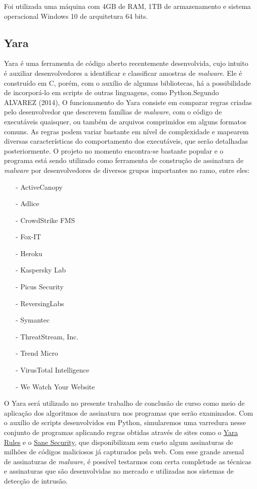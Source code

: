 Foi utilizada uma máquina com 4GB de RAM, 1TB de armazenamento e sistema operacional Windows 10 de arquitetura 64 bits.

\subsection{Yara}
\label{sub:Yara}

Yara é uma ferramenta de código aberto recentemente desenvolvida, cujo intuito é
auxiliar desenvolvedores a identificar e classificar amostras de
\textit{malware}. Ele é construído em C, porém, com o auxílio de algumas
bibliotecas, há a possibilidade de incorporá-lo em scripts de outras linguagens,
como Python.Segundo ALVAREZ (2014), O funcionamento do Yara consiste em comparar
regras criadas pelo desenvolvedor que descrevem famílias de \textit{malware},
com o código de executáveis quaisquer, ou também de arquivos comprimidos em
alguns formatos comuns. As regras podem variar bastante em nível de complexidade
e mapearem diversas características do comportamento dos executáveis, que serão
detalhadas posteriormente. O projeto no momento encontra-se bastante popular e o
programa está sendo utilizado como ferramenta de construção de assinatura de
\textit{malware} por desenvolvedores de diversos grupos importantes no ramo,
entre eles:
\begin{itemize}
	\item[-] ActiveCanopy
	\item[-] Adlice
	\item[-] CrowdStrike FMS
	\item[-] Fox-IT
	\item[-] Heroku
	\item[-] Kaspersky Lab
	\item[-] Picus Security
	\item[-] ReversingLabs
	\item[-] Symantec
	\item[-] ThreatStream, Inc.
	\item[-] Trend Micro
	\item[-] VirusTotal Intelligence
	\item[-] We Watch Your Website
\end{itemize}

O Yara será utilizado no presente trabalho de conclusão de curso como meio de
aplicação dos algoritmos de assinatura nos programas que serão examinados. Com
o auxílio de scripts desenvolvidos em Python, simularemos uma varredura nesse
conjunto de programas aplicando regras obtidas através de sites como o
\href{yararules.org}{Yara Rules} e o
\href{http://sanesecurity.com/usage/signatures/}{Sane Security}, que
disponibilizam sem custo algum assinaturas de milhões de códigos maliciosos já
capturados pela web. Com esse grande arsenal de assinaturas de \textit{malware}, é
possível testarmos com certa completude as técnicas e assinaturas que são
desenvolvidas no mercado e utilizadas nos sistemas de detecção de intrusão.

